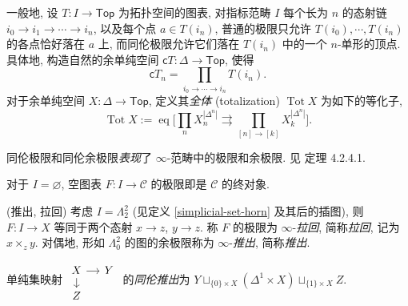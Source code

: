 \begin{remark}
\begin{center}
	\end{center}
	一般地, 设 $T\colon I\to \mathsf {Top}$ 为拓扑空间的图表, 对指标范畴 $I$ 每个长为 $n$ 的态射链 $i_0\to i_1\to\cdots\to i_n$, 以及每个点 $a\in T(i_n)$, 普通的极限只允许 $T(i_0),\cdots,T(i_n)$ 的各点恰好落在 $a$ 上, 而同伦极限允许它们落在 $T(i_n)$ 中的一个 $n$-单形的顶点. 具体地, 构造自然的余单纯空间 $\mathsf cT\colon \Delta \to \mathsf {Top}$, 使得
	$$
	\mathsf cT_n = \prod_{i_0\to \cdots\to i_n} T(i_n).
	$$
	对于余单纯空间 $X\colon \Delta\to\mathsf {Top}$, 定义其\emph{全体} (totalization)\footnotemark{} $\operatorname{Tot}X$ 为如下的等化子,
	$$
	\operatorname{Tot}X := \operatorname{eq}\Big[
	\prod_{n}X_n^{|\Delta^n|}
	\rightrightarrows
	\prod_{[n]\to [k]} X_k^{|\Delta^n|}
	\Big].
	$$
	
	同伦极限和同伦余极限\emph{表现}了 $\infty$-范畴中的极限和余极限. 见 \cite{HTT} 定理 4.2.4.1.
\end{remark}

\begin{example}
	{}
	对于 $I = \varnothing$, 空图表 $F\colon I\to \mathcal C$ 的极限即是 $\mathcal C$ 的终对象.
\end{example}

\begin{example}
	{(推出, 拉回)}
	考虑 $I = \Lambda_2^2$ (见定义 \ref{simplicial-set-horn} 及其后的插图), 则 $F\colon I\to X$ 等同于两个态射 $x\to z$, $y\to z$. 称 $F$ 的极限为 $\infty$-\emph{拉回}, 简称\emph{拉回}, 记为 $x\times_z y$.
	对偶地, 形如 $\Lambda_0^2$ 的图的余极限称为 $\infty$-\emph{推出}, 简称\emph{推出}.
	
	单纯集映射 %
	$\begin{tikzcd}[ampersand replacement=\&,sep=small]
		X \& Y \\
		Z
		\arrow[from=1-1, to=2-1]
		\arrow[from=1-1, to=1-2]
	\end{tikzcd}$ 的\emph{同伦推出}为 $Y\sqcup_{\{0\}\times X}(\Delta^1\times X)\sqcup_{\{1\}\times X}Z$.
\end{example}


